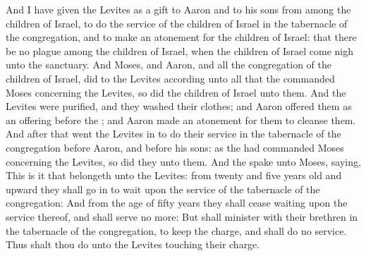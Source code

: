 \begin{biblechapter}
\verse And I have given the Levites as a gift to Aaron and to his sons from among the children of Israel, to do the service of the children of Israel in the tabernacle of the congregation, and to make an atonement for the children of Israel: that there be no plague among the children of Israel, when the children of Israel come nigh unto the sanctuary.
\verse And Moses, and Aaron, and all the congregation of the children of Israel, did to the Levites according unto all that the \LORD commanded Moses concerning the Levites, so did the children of Israel unto them.
\verse And the Levites were purified, and they washed their clothes; and Aaron offered them as an offering before the \LORD; and Aaron made an atonement for them to cleanse them.
\verse And after that went the Levites in to do their service in the tabernacle of the congregation before Aaron, and before his sons: as the \LORD had commanded Moses concerning the Levites, so did they unto them.
\verse And the \LORD spake unto Moses, saying,
\verse This is it that belongeth unto the Levites: from twenty and five years old and upward they shall go in to wait upon the service of the tabernacle of the congregation:
\verse And from the age of fifty years they shall cease waiting upon the service thereof, and shall serve no more:
\verse But shall minister with their brethren in the tabernacle of the congregation, to keep the charge, and shall do no service. Thus shalt thou do unto the Levites touching their charge.
\end{biblechapter}

